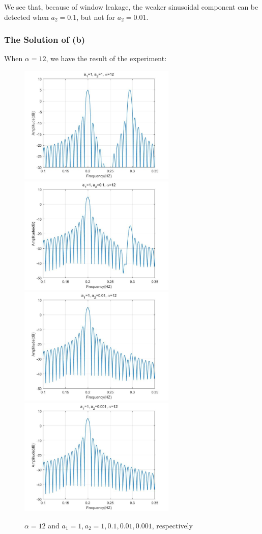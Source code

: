 \documentclass[UTF-8, a4paper, 12pt]{ctexart}
\begin{document}
We see that, because of window leakage, the weaker sinusoidal component can be detected when $a_2 = 0.1$, but not for $a_2 = 0.01$.\newpage

\subsubsection{The Solution of (b)}
When $\alpha=12$, we have the result of the experiment:
\begin{figure}[htbp]
    \centering
    \includegraphics[width=7.5cm ]{2/ea5.jpg}
    \includegraphics[width=7.5cm ]{2/ea6.jpg}
    \includegraphics[width=7.5cm ]{2/ea7.jpg}
    \includegraphics[width=7.5cm ]{2/ea8.jpg}
    \caption{$\alpha=12$ and $a_1=1, a_2=1, 0.1,0.01,0.001$, respectively}
\end{figure}
\end{document}
